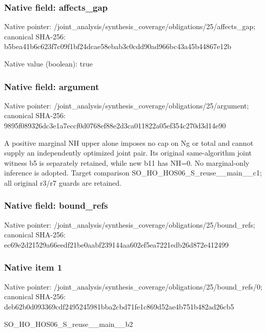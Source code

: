 \documentclass[10pt,a4paper]{article}
\begin{document}
\subsubsection{Native field: affects\_\allowbreak{}gap}
Native pointer: /joint\_\allowbreak{}analysis/synthesis\_\allowbreak{}coverage/obligations/25/affects\_\allowbreak{}gap; canonical SHA-256: b5bea41b6c623f7c09f1bf24dcae58ebab3c0cdd90ad966bc43a45b44867e12b

Native value (boolean): true

\subsubsection{Native field: argument}
Native pointer: /joint\_\allowbreak{}analysis/synthesis\_\allowbreak{}coverage/obligations/25/argument; canonical SHA-256: 9895f089326dc3e1a7eccf0d0768ef88e2d3ca011822a05ef354c270d3d14e90

\begingroup\raggedright\sloppy A positive marginal NH upper alone imposes no cap on Ng or total and cannot supply an independently optimized joint pair. Its original same-algorithm joint witness b5 is separately retained,\allowbreak{} while new b11 has NH=\allowbreak{}0. No marginal-only inference is adopted. Target comparison SO\_\allowbreak{}HO\_\allowbreak{}HOS06\_\allowbreak{}S\_\allowbreak{}reuse\_\allowbreak{}\_\allowbreak{}main\_\allowbreak{}\_\allowbreak{}c1;\allowbreak{} all original r3/\allowbreak{}r7 guards are retained.\par\endgroup

\subsubsection{Native field: bound\_\allowbreak{}refs}
Native pointer: /joint\_\allowbreak{}analysis/synthesis\_\allowbreak{}coverage/obligations/25/bound\_\allowbreak{}refs; canonical SHA-256: ec69e2d21529a66eedf21be0aabf239144aa602ef5ea7221edb26d872e412499

\subsubsection{Native item 1}
Native pointer: /joint\_\allowbreak{}analysis/synthesis\_\allowbreak{}coverage/obligations/25/bound\_\allowbreak{}refs/0; canonical SHA-256: deb62b0d093369cdf2495245981bba2cbd71fe1c869d52ae4b751b482ad26cb5

\begingroup\raggedright\sloppy SO\_\allowbreak{}HO\_\allowbreak{}HOS06\_\allowbreak{}S\_\allowbreak{}reuse\_\allowbreak{}\_\allowbreak{}main\_\allowbreak{}\_\allowbreak{}b2\par\endgroup
\end{document}
